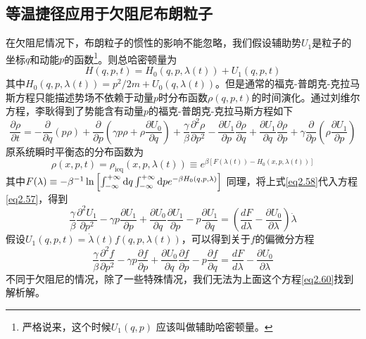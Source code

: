 \subsection{等温捷径应用于欠阻尼布朗粒子}
\qquad 在欠阻尼情况下，布朗粒子的惯性的影响不能忽略，我们假设辅助势$U_1$是粒子的坐标$q$和动能$p$的函数\footnote{严格说来，这个时候$U_1 (q,p)$ 应该叫做辅助哈密顿量。}。则总哈密顿量为
\begin{equation}
    H(q, p, t)=H_{0}(q, p, \lambda(t))+U_{1}(q, p, t)
    \label{eq2.56}
\end{equation}
其中$H_{0}(q, p, \lambda(t))=p^{2}/{2 m}+U_{0}(q, \lambda(t))$。但是通常的福克-普朗克-克拉马斯方程只能描述势场不依赖于动量$p$时分布函数$\rho (q,p,t)$的时间演化。通过刘维尔方程，李耿\cite{Li2016}得到了势能含有动量$p$的福克-普朗克-克拉马斯方程如下
\begin{equation}
        \frac{\partial \rho}{\partial t}=-\frac{\partial}{\partial q}(p \rho)+\frac{\partial}{\partial p}\left(\gamma p \rho+\rho \frac{\partial U_{0}}{\partial q}\right)+\frac{\gamma}{\beta} \frac{\partial^{2} \rho}{\partial p^{2}} -\frac{\partial U_{1}}{\partial p} \frac{\partial \rho}{\partial q}+\frac{\partial U_{1}}{\partial q} \frac{\partial \rho}{\partial p}+\gamma \frac{\partial}{\partial p}\left(\rho \frac{\partial U_{1}}{\partial p}\right)
    \label{eq2.57}
\end{equation}
原系统瞬时平衡态的分布函数为
\begin{equation}
    \rho(x, p, t)=\rho_{\mathrm{ieq}}(x, p, \lambda(t)) \equiv e^{\beta\left[F(\lambda(t))-H_{0}(x, p, \lambda(t))\right]}
    \label{eq2.58}
\end{equation}
其中$F(\lambda) \equiv-\beta^{-1} \ln \left[\int_{-\infty}^{+\infty} \mathrm{d} q \int_{-\infty}^{+\infty} \mathrm{d} p e^{-\beta H_{0}(q, p, \lambda)}\right]$
同理，将上式\eqref{eq2.58}代入方程\eqref{eq2.57}，得到
\begin{equation}
    \frac{\gamma}{\beta} \frac{\partial^{2} U_{1}}{\partial p^{2}}-\gamma p \frac{\partial U_{1}}{\partial p}+\frac{\partial U_{0}}{\partial q} \frac{\partial U_{1}}{\partial p}-p \frac{\partial U_{1}}{\partial q}=\left(\frac{d F}{d \lambda}-\frac{\partial U_{0}}{\partial \lambda}\right) \dot{\lambda}
    \label{eq2.59}
\end{equation}
假设$U_{1}(q, p, t)=\dot{\lambda}(t) f(q, p, \lambda(t))$，可以得到关于$f$的偏微分方程
\begin{equation}
    \frac{\gamma}{\beta} \frac{\partial^{2} f}{\partial p^{2}}-\gamma p \frac{\partial f}{\partial p}+\frac{\partial U_{0}}{\partial q} \frac{\partial f}{\partial p}-p \frac{\partial f}{\partial q}=\frac{d F}{d \lambda}-\frac{\partial U_{0}}{\partial \lambda}
    \label{eq2.60}
\end{equation}
不同于欠阻尼的情况，除了一些特殊情况，我们无法为上面这个方程\eqref{eq2.60}找到解析解。

